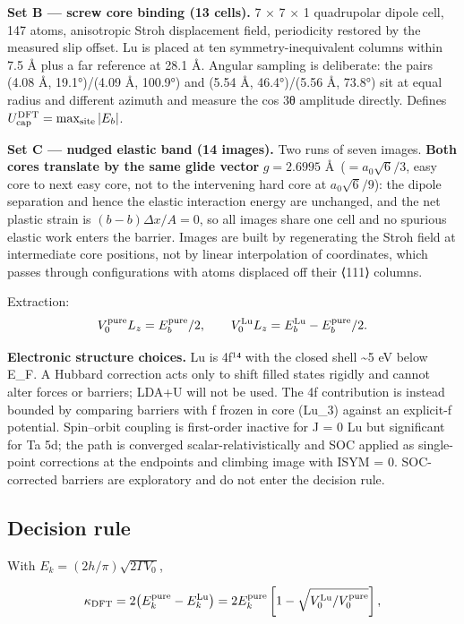 \textbf{Set B --- screw core binding (13 cells).} 7 × 7 × 1 quadrupolar dipole cell, 147 atoms, anisotropic Stroh displacement field, periodicity restored by the measured slip offset. Lu is placed at ten symmetry-inequivalent columns within 7.5 Å plus a far reference at 28.1 Å. Angular sampling is deliberate: the pairs (4.08 Å, 19.1°)/(4.09 Å, 100.9°) and (5.54 Å, 46.4°)/(5.56 Å, 73.8°) sit at equal radius and different azimuth and measure the cos 3θ amplitude directly. Defines \(U_{\rm cap}^{\rm DFT} = \max_{\rm site}|E_b|\).

\textbf{Set C --- nudged elastic band (14 images).} Two runs of seven images. \textbf{Both cores translate by the same glide vector} \(g = 2.6995\) \AA~(\(= a_0\sqrt{6}/3\), easy core to next easy core, not to the intervening hard core at \(a_0\sqrt{6}/9\)): the dipole separation and hence the elastic interaction energy are unchanged, and the net plastic strain is \((b-b)\Delta x/A = 0\), so all images share one cell and no spurious elastic work enters the barrier. Images are built by regenerating the Stroh field at intermediate core positions, not by linear interpolation of coordinates, which passes through configurations with atoms displaced off their ⟨111⟩ columns.

Extraction: \[V_0^{\rm pure}L_z = E_b^{\rm pure}/2,\qquad V_0^{\rm Lu}L_z = E_b^{\rm Lu} - E_b^{\rm pure}/2.\]

\textbf{Electronic structure choices.} Lu is 4f¹⁴ with the closed shell \textasciitilde5 eV below E\_F. A Hubbard correction acts only to shift filled states rigidly and cannot alter forces or barriers; LDA+U will not be used. The 4f contribution is instead bounded by comparing barriers with f frozen in core (Lu\_3) against an explicit-f potential. Spin--orbit coupling is first-order inactive for J = 0 Lu but significant for Ta 5d; the path is converged scalar-relativistically and SOC applied as single-point corrections at the endpoints and climbing image with ISYM = 0. SOC-corrected barriers are exploratory and do not enter the decision rule.

\hypertarget{decision-rule}{%
\subsection{Decision rule}\label{sec:decision-rule}}

With \(E_k = (2h/\pi)\sqrt{2\Gamma V_0}\),

\[\kappa_{\rm DFT} = 2\bigl(E_k^{\rm pure} - E_k^{\rm Lu}\bigr) = 2E_k^{\rm pure}\left[1 - \sqrt{V_0^{\rm Lu}/V_0^{\rm pure}}\right],\]

